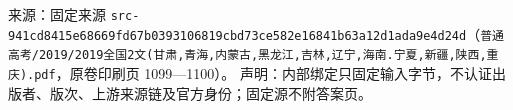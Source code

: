 
\begin{gktip}
来源：固定来源 \texttt{src-941cd8415e68669fd67b0393106819cbd73ce582e16841b63a12d1ada9e4d24d}（\texttt{普通高考/2019/2019全国2文(甘肃,青海,内蒙古,黑龙江,吉林,辽宁,海南.宁夏,新疆,陕西,重庆).pdf}，原卷印刷页 1099—1100）。
声明：内部绑定只固定输入字节，不认证出版者、版次、上游来源链及官方身份；固定源不附答案页。
\end{gktip}

\par\medskip


